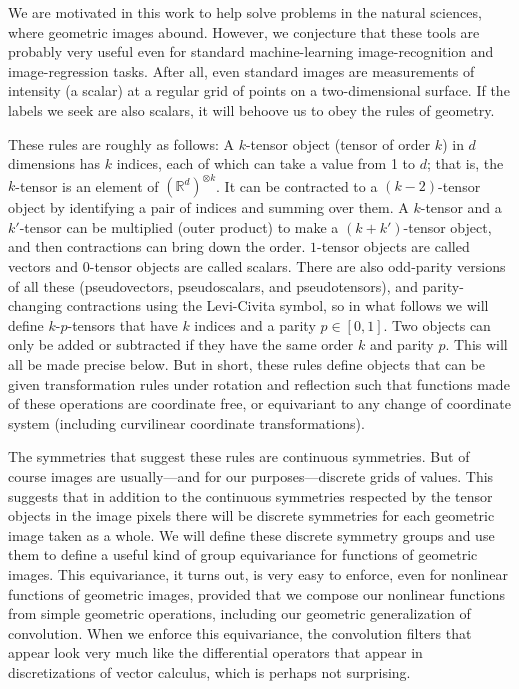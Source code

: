 \documentclass{article}
\theoremstyle{plain}
\begin{document}
We are motivated in this work to help solve problems in the natural sciences, where geometric images abound.
However, we conjecture that these tools are probably very useful even for standard machine-learning image-recognition and image-regression tasks.
After all, even standard images are measurements of intensity (a scalar) at a regular grid of points on a two-dimensional surface.
If the labels we seek are also scalars, it will behoove us to obey the rules of geometry.

These rules are roughly as follows:
A $k$-tensor object (tensor of order $k$) in $d$ dimensions has $k$ indices, each of which can take a value from 1 to $d$; that is, the $k$-tensor is an element of $(\mathbb R^d)^{\otimes k}$.
It can be contracted to a $(k-2)$-tensor object by identifying a pair of indices and summing over them.
A $k$-tensor and a $k'$-tensor can be multiplied (outer product) to make a $(k+k')$-tensor object, and then contractions can bring down the order.
$1$-tensor objects are called vectors and $0$-tensor objects are called scalars.
There are also odd-parity versions of all these (pseudovectors, pseudoscalars, and pseudotensors), and parity-changing contractions using the Levi-Civita symbol, so in what follows we will define $k$-$p$-tensors that have $k$ indices and a parity $p\in [0, 1]$.
Two objects can only be added or subtracted if they have the same order $k$ and parity $p$.
This will all be made precise below.
But in short, these rules define objects that can be given transformation rules under rotation and reflection such that functions made of these operations are coordinate free, or equivariant to any change of coordinate system (including curvilinear coordinate transformations).

The symmetries that suggest these rules are continuous symmetries.
But of course images are usually---and for our purposes---discrete grids of values.
This suggests that in addition to the continuous symmetries respected by the tensor objects in the image pixels there will be discrete symmetries for each geometric image taken as a whole.
We will define these discrete symmetry groups and use them to define a useful kind of group equivariance for functions of geometric images.
This equivariance, it turns out, is very easy to enforce, even for nonlinear functions of geometric images, provided that we compose our nonlinear functions from simple geometric operations, including our geometric generalization of convolution.
When we enforce this equivariance, the convolution filters that appear look very much like the differential operators that appear in discretizations of vector calculus, which is perhaps not surprising.
\end{document}
